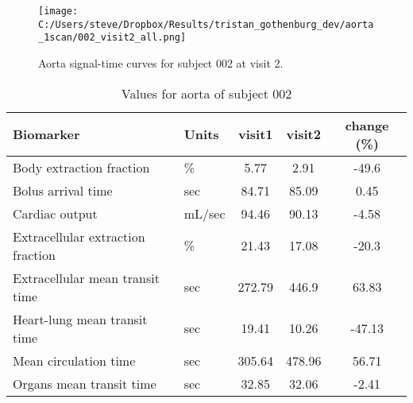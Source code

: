 \documentclass{epflreport}%
\begin{document}
%


\begin{figure}[h!]%
\centering%
\texttt{[image: C:/Users/steve/Dropbox/Results/tristan\_gothenburg\_dev/aorta\_1scan/002\_visit2\_all.png]}%
\caption{Aorta signal{-}time curves for subject 002 at visit 2.}%
\end{figure}

%


\begin{table}[h!]%
\centering%
\begin{tabular}{llccc}%
\hline%
Biomarker&Units&visit1&visit2&change (\%)\\%
\hline%
Body extraction fraction&\%&5.77&2.91&{-}49.6\\%
Bolus arrival time&sec&84.71&85.09&0.45\\%
Cardiac output&mL/sec&94.46&90.13&{-}4.58\\%
Extracellular extraction fraction&\%&21.43&17.08&{-}20.3\\%
Extracellular mean transit time&sec&272.79&446.9&63.83\\%
Heart{-}lung mean transit time&sec&19.41&10.26&{-}47.13\\%
Mean circulation time&sec&305.64&478.96&56.71\\%
Organs mean transit time&sec&32.85&32.06&{-}2.41\\%
\hline%
\end{tabular}%
\caption{Values for aorta of subject 002}%
\end{table}

%
\end{document}
